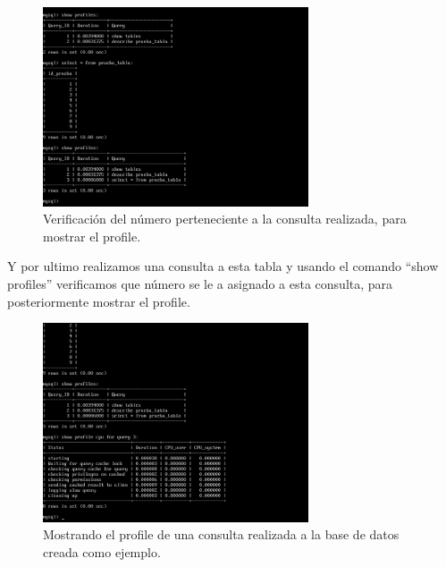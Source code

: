 \begin{figure}[H]
	\begin{center}
		\includegraphics[width=0.7\textwidth]{Imagenes/Verificando_numero_de_consulta}
		\caption{Verificación del número perteneciente a la consulta realizada, para mostrar el profile.} \label{fig:29}
	\end{center}
\end{figure}
\newpage
Y por ultimo realizamos una consulta \cite{CONSULTAmysql} a esta tabla y usando el comando ``show profiles'' verificamos que número se le a asignado a esta consulta, para posteriormente mostrar el profile.

\begin{figure}[H]
	\begin{center}
		\includegraphics[width=0.7\textwidth]{Imagenes/Profile_aplicado_a_consulta}
		\caption{Mostrando el profile de una consulta realizada a la base de datos creada como ejemplo.} \label{fig:30}
	\end{center}
\end{figure}


\newpage


